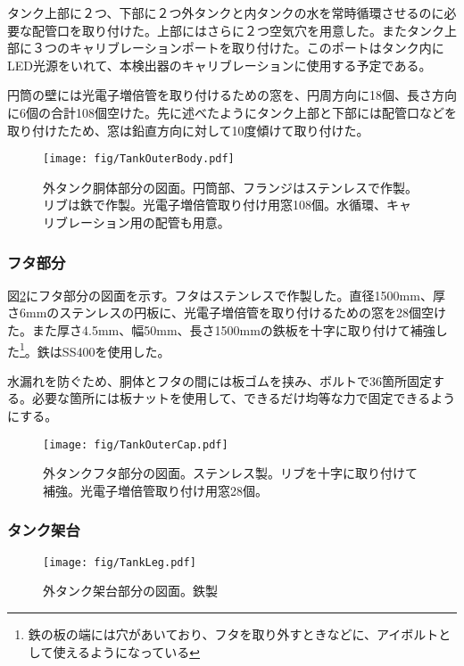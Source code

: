 \documentclass[11pt]{jreport}
\newcommand{\figref}[1]{図\ref{#1}}
\begin{document}
タンク上部に２つ、下部に２つ外タンクと内タンクの水を常時循環させるのに必要な配管口を取り付けた。上部にはさらに２つ空気穴を用意した。またタンク上部に３つのキャリブレーションポートを取り付けた。このポートはタンク内にLED光源をいれて、本検出器のキャリブレーションに使用する予定である。

円筒の壁には光電子増倍管を取り付けるための窓を、円周方向に18個、長さ方向に6個の合計108個空けた。先に述べたようにタンク上部と下部には配管口などを取り付けたため、窓は鉛直方向に対して10度傾けて取り付けた。



\begin{figure}[htbp]
\centering
\texttt{[image: fig/TankOuterBody.pdf]}
\caption[外タンク胴体部分の図面]{外タンク胴体部分の図面。円筒部、フランジはステンレスで作製。リブは鉄で作製。光電子増倍管取り付け用窓108個。水循環、キャリブレーション用の配管も用意。}
\label{TankOuterBody}
\end{figure}

\subsubsection{フタ部分}
\figref{TankOuterCap}にフタ部分の図面を示す。フタはステンレスで作製した。直径1500mm、厚さ6mmのステンレスの円板に、光電子増倍管を取り付けるための窓を28個空けた。また厚さ4.5mm、幅50mm、長さ1500mmの鉄板を十字に取り付けて補強した\footnote{鉄の板の端には穴があいており、フタを取り外すときなどに、アイボルトとして使えるようになっている}。鉄はSS400を使用した。

水漏れを防ぐため、胴体とフタの間には板ゴムを挟み、ボルトで36箇所固定する。必要な箇所には板ナットを使用して、できるだけ均等な力で固定できるようにする。

\begin{figure}[htbp]
\centering
\texttt{[image: fig/TankOuterCap.pdf]}
\caption[外タンクフタ部分の図面]{外タンクフタ部分の図面。ステンレス製。リブを十字に取り付けて補強。光電子増倍管取り付け用窓28個。}
\label{TankOuterCap}
\end{figure}

\subsubsection{タンク架台}

\begin{figure}[htbp]
\centering
\texttt{[image: fig/TankLeg.pdf]}
\caption[外タンク架台部分の図面]{外タンク架台部分の図面。鉄製}
\label{TankLeg}
\end{figure}
\end{document}
